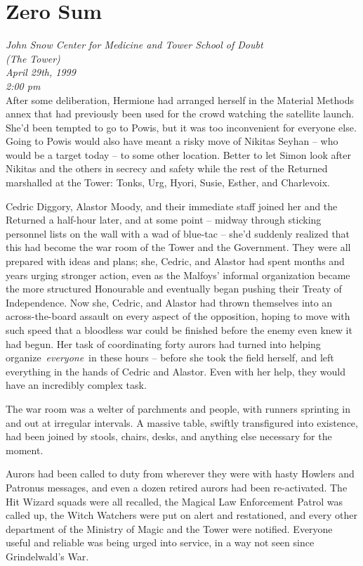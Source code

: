 \hypertarget{zero-sum}{%
\chapter{Zero Sum}\label{zero-sum}}

\emph{John Snow Center for Medicine and Tower School of Doubt\\
(The Tower)}\\
\emph{April 29th, 1999}\\
\emph{2:00 pm}\\

After some deliberation, Hermione had arranged herself in the Material
Methods annex that had previously been used for the crowd watching the
satellite launch. She'd been tempted to go to Powis, but it was too
inconvenient for everyone else. Going to Powis would also have meant a
risky move of Nikitas Seyhan -- who would be a target today -- to some
other location. Better to let Simon look after Nikitas and the others in
secrecy and safety while the rest of the Returned marshalled at the
Tower: Tonks, Urg, Hyori, Susie, Esther, and Charlevoix.

Cedric Diggory, Alastor Moody, and their immediate staff joined her and
the Returned a half-hour later, and at some point -- midway through
sticking personnel lists on the wall with a wad of blue-tac -- she'd
suddenly realized that this had become the war room of the Tower and the
Government. They were all prepared with ideas and plans; she, Cedric,
and Alastor had spent months and years urging stronger action, even as
the Malfoys' informal organization became the more structured Honourable
and eventually began pushing their Treaty of Independence. Now she,
Cedric, and Alastor had thrown themselves into an across-the-board
assault on every aspect of the opposition, hoping to move with such
speed that a bloodless war could be finished before the enemy even knew
it had begun. Her task of coordinating forty aurors had turned into
helping organize~\emph{everyone}~in these hours -- before she took the
field herself, and left everything in the hands of Cedric and Alastor.
Even with her help, they would have an incredibly complex task.

The war room was a welter of parchments and people, with runners
sprinting in and out at irregular intervals. A massive table, swiftly
transfigured into existence, had been joined by stools, chairs, desks,
and anything else necessary for the moment.

Aurors had been called to duty from wherever they were with hasty
Howlers and Patronus messages, and even a dozen retired aurors had been
re-activated. The Hit Wizard squads were all recalled, the Magical Law
Enforcement Patrol was called up, the Witch Watchers were put on alert
and restationed, and every other department of the Ministry of Magic and
the Tower were notified. Everyone useful and reliable was being urged
into service, in a way not seen since Grindelwald's War.

